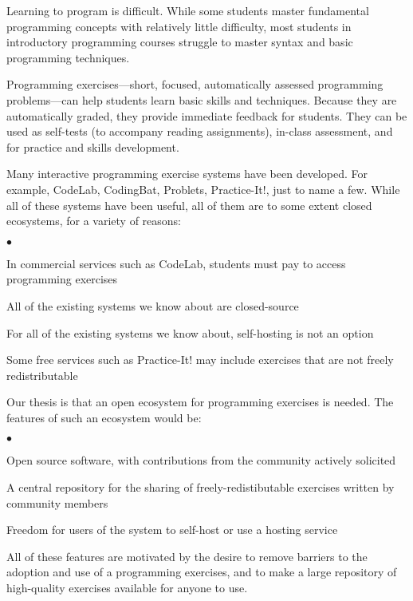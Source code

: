 \documentclass[11pt]{article}
\newenvironment{denseItemize}{%
\begin{list}{$\bullet$}{\setlength{\itemsep}{0in}\setlength{\parsep}{.05in}}}{\end{list}}
\begin{document}
Learning to program is difficult.  While some students master
fundamental programming concepts with relatively little difficulty,
most students in introductory programming courses struggle
to master syntax and basic programming techniques.

Programming exercises---short, focused, automatically assessed
programming problems---can help students learn basic skills and techniques.
Because they are automatically graded, they provide immediate feedback
for students.  They can be used as self-tests (to accompany reading assignments),
in-class assessment, and for practice and skills development.

Many interactive programming exercise systems have been developed.
For example, CodeLab, CodingBat, Problets, Practice-It!, just to
name a few.  While all of these systems have been useful, all of
them are to some extent closed ecosystems, for a variety of reasons:

\begin{denseItemize}
\item In commercial services such as CodeLab,
      students must pay to access programming exercises
\item All of the existing systems we know about are closed-source
\item For all of the existing systems we know about,
      self-hosting is not an option
\item Some free services such as Practice-It! may include
      exercises that are not freely redistributable
\end{denseItemize}

Our thesis is that an open ecosystem for programming exercises
is needed.  The features of such an ecosystem would be:

\begin{denseItemize}
\item Open source software, with contributions from the community
      actively solicited
\item A central repository for the sharing of freely-redistibutable exercises
      written by community members
\item Freedom for users of the system to self-host or use a hosting service
\end{denseItemize}

All of these features are motivated by the desire to remove 
barriers to the adoption and use of a programming exercises,
and to make a large repository of high-quality exercises available
for anyone to use.
\end{document}

